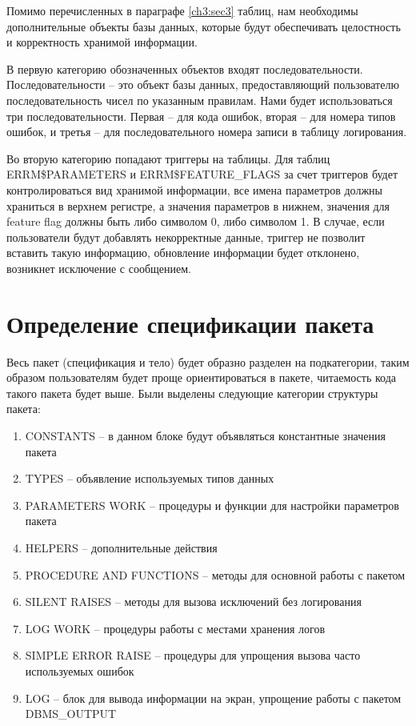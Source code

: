 Помимо перечисленных в параграфе \ref{ch3:sec3} таблиц, нам необходимы дополнительные объекты базы данных, которые будут обеспечивать целостность и корректность хранимой информации.

В первую категорию обозначенных объектов входят последовательности. Последовательности – это объект базы данных, предоставляющий пользователю последовательность чисел по указанным правилам. Нами будет использоваться три последовательности. Первая – для кода ошибок, вторая – для номера типов ошибок, и третья – для последовательного номера записи в таблицу логирования.  

Во вторую категорию попадают триггеры на таблицы. Для таблиц ERRM\$PARAMETERS и ERRM\$FEATURE\_FLAGS за счет триггеров будет контролироваться вид хранимой информации, все имена параметров должны храниться в верхнем регистре, а значения параметров в нижнем, значения для feature flag должны быть либо символом 0, либо символом 1. В случае, если пользователи будут добавлять некорректные данные, триггер не позволит вставить такую информацию, обновление информации будет отклонено, возникнет исключение с сообщением. 


\section{Определение спецификации пакета} \label{ch3:sec5}
 
Весь пакет (спецификация и тело) будет образно разделен на подкатегории, таким образом пользователям будет проще ориентироваться в пакете, читаемость кода такого пакета будет выше. Были выделены следующие категории структуры пакета: 

\begin{enumerate} 
\item CONSTANTS – в данном блоке будут объявляться константные значения пакета
\item TYPES – объявление используемых типов данных
\item PARAMETERS WORK – процедуры и функции для настройки параметров пакета
\item HELPERS – дополнительные действия 
\item PROCEDURE AND FUNCTIONS – методы для основной работы с пакетом
\item SILENT RAISES – методы для вызова исключений без логирования
\item LOG WORK – процедуры работы с местами хранения логов
\item SIMPLE ERROR RAISE – процедуры для упрощения вызова часто используемых ошибок
\item LOG – блок для вывода информации на экран, упрощение работы с пакетом DBMS\_OUTPUT
\end{enumerate} 

